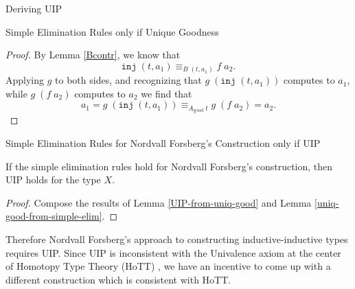 \documentclass[runningheads]{llncs}
\newcommand{\good}[1]{{#1}_\text{good}}
\newcommand{\IdA}[3]{{#1}\equiv_{#3}{#2}}
\newcommand{\inj}{\texttt{inj}}
\def\Forsberg/{Nordvall Forsberg}
\begin{document}
\begin{section}{Deriving UIP}
\begin{subsection}{Simple Elimination Rules only if Unique Goodness}
\begin{proof}
    By Lemma \ref{Bcontr}, we know that \[\IdA{\inj\;(t, a_1)}{f\;a_2}{B\;(t, a_1)}.\] Applying $g$ to both sides, and recognizing that $g\;(\inj\;(t,a_1))$ computes to $a_1$, while $g\;(f\;a_2)$ computes to $a_2$ we find that \[a_1 = g\;(\inj\;(t,a_1)) \equiv_{\good{A}\;t} g\;(f\;a_2) = a_2.\]
\end{proof}

\end{subsection}

\begin{subsection}{Simple Elimination Rules for \Forsberg/'s Construction only if UIP}

\begin{theorem}\label{Forsberg-gives-UIP}
    If the simple elimination rules hold for \Forsberg/'s construction, then UIP holds for the type $X$.
\end{theorem}
\begin{proof}
    Compose the results of Lemma \ref{UIP-from-uniq-good} and Lemma \ref{uniq-good-from-simple-elim}.
\end{proof}

Therefore \Forsberg/'s approach to constructing inductive-inductive types requires UIP. Since UIP is inconsistent with the Univalence axiom at the center of Homotopy Type Theory (HoTT) \citep{hottbook}, we have an incentive to come up with a different construction which is consistent with HoTT.

\end{subsection}

\end{section}
\end{document}
